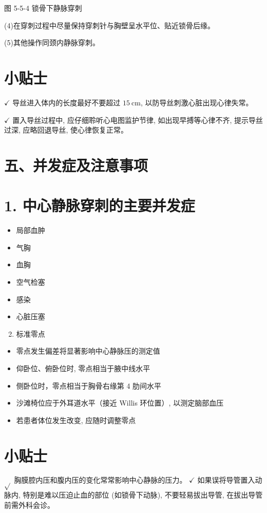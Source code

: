 \documentclass[10pt]{article}
\begin{document}
图 5-5-4 锁骨下静脉穿刺

(4)在穿刺过程中尽量保持穿刺针与胸壁呈水平位、贴近锁骨后缘。

(5)其他操作同颈内静脉穿刺。

\section*{小贴士}
$\checkmark$ 导丝进入体内的长度最好不要超过 $15 \mathrm{~cm}$, 以防导丝刺激心脏出现心律失常。

$\checkmark$ 置入导丝过程中, 应仔细聆听心电图监护节律, 如出现早搏等心律不齐, 提示导丝过深, 应略回退导丝, 使心律恢复正常。

\section*{五、并发症及注意事项}
\section*{1. 中心静脉穿刺的主要并发症}
\begin{itemize}
  \item 局部血肿
  \item 气胸
  \item 血胸
  \item 空气检塞
  \item 感染
  \item 心脏压塞
\end{itemize}

\begin{enumerate}
  \setcounter{enumi}{1}
  \item 标准零点
\end{enumerate}

\begin{itemize}
  \item 零点发生偏差将显著影响中心静脉压的测定值
  \item 仰卧位、俯卧位时, 零点相当于腋中线水平
  \item 侧卧位时，零点相当于胸骨右缘第 4 肋间水平
  \item 沙滩椅位应于外耳道水平（接近 Willis 环位置）, 以测定脑部血压
  \item 若患者体位发生改变, 应随时调整零点
\end{itemize}

\section*{小贴士}
$\sqrt{ }$ 胸膜腔内压和腹内压的变化常常影响中心静脉的压力。 $\checkmark$ 如果误将导管置入动脉内, 特别是难以压迫止血的部位 (如锁骨下动脉), 不要轻易拔出导管, 在拔出导管前需外科会诊。
\end{document}

